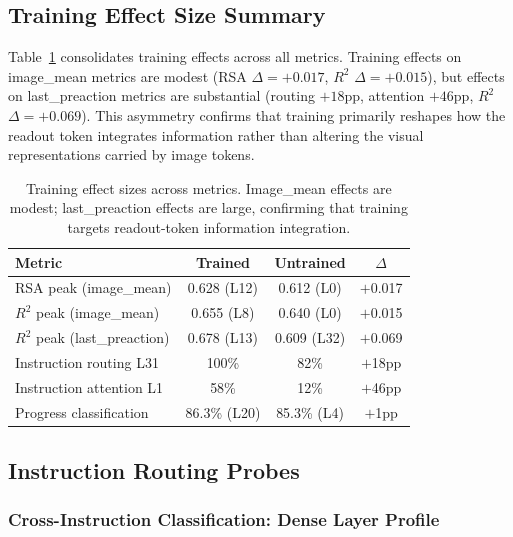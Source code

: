 \subsection{Training Effect Size Summary}
\label{sec:training_effect_summary}

Table~\ref{tab:training_effect_summary} consolidates training effects across all metrics.
Training effects on image\_mean metrics are modest (RSA $\Delta = +0.017$, $R^2$ $\Delta = +0.015$), but effects on last\_preaction metrics are substantial (routing $+18$pp, attention $+46$pp, $R^2$ $\Delta = +0.069$).
This asymmetry confirms that training primarily reshapes how the readout token integrates information rather than altering the visual representations carried by image tokens.

\begin{table}[h]
\centering
\caption{Training effect sizes across metrics. Image\_mean effects are modest; last\_preaction effects are large, confirming that training targets readout-token information integration.}
\label{tab:training_effect_summary}
\small
\begin{tabular}{lccc}
\toprule
Metric & Trained & Untrained & $\Delta$ \\
\midrule
RSA peak (image\_mean) & 0.628 (L12) & 0.612 (L0) & $+$0.017 \\
$R^2$ peak (image\_mean) & 0.655 (L8) & 0.640 (L0) & $+$0.015 \\
$R^2$ peak (last\_preaction) & 0.678 (L13) & 0.609 (L32) & $+$0.069 \\
Instruction routing L31 & 100\% & 82\% & $+$18pp \\
Instruction attention L1 & 58\% & 12\% & $+$46pp \\
Progress classification & 86.3\% (L20) & 85.3\% (L4) & $+$1pp \\
\bottomrule
\end{tabular}
\end{table}

\subsection{Instruction Routing Probes}
\label{sec:routing_appendix}

\subsubsection{Cross-Instruction Classification: Dense Layer Profile}
\label{sec:dense_routing}

